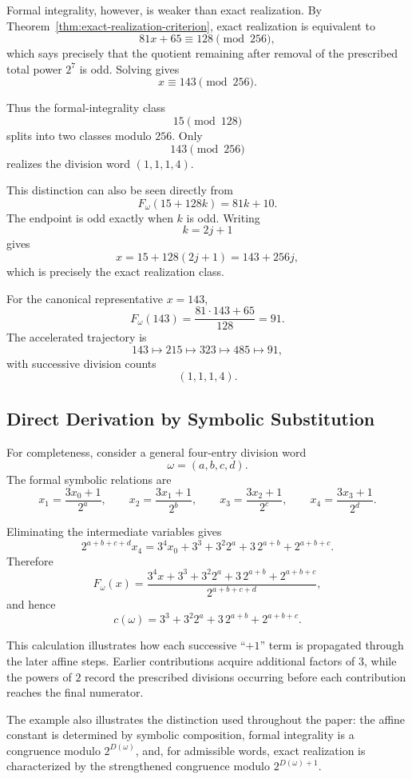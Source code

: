 \documentclass[12pt, oneside]{article}
\numberwithin{equation}{section}
\theoremstyle{definition}
\theoremstyle{plain}
\theoremstyle{remark}
\begin{document}
Formal integrality, however, is weaker than exact realization. By
Theorem~\ref{thm:exact-realization-criterion}, exact realization is
equivalent to
\[
81x+65
\equiv
128
\pmod{256},
\]
which says precisely that the quotient remaining after removal of the
prescribed total power \(2^7\) is odd. Solving gives
\[
\boxed{
x\equiv143\pmod{256}.
}
\]

Thus the formal-integrality class
\[
15\pmod{128}
\]
splits into two classes modulo \(256\). Only
\[
143\pmod{256}
\]
realizes the division word \((1,1,1,4)\).

This distinction can also be seen directly from
\[
F_\omega(15+128k)=81k+10.
\]
The endpoint is odd exactly when \(k\) is odd. Writing
\[
k=2j+1
\]
gives
\[
x
=
15+128(2j+1)
=
143+256j,
\]
which is precisely the exact realization class.

For the canonical representative \(x=143\),
\[
F_\omega(143)
=
\frac{81\cdot143+65}{128}
=
91.
\]
The accelerated trajectory is
\[
143\longmapsto215\longmapsto323\longmapsto485\longmapsto91,
\]
with successive division counts
\[
(1,1,1,4).
\]

\subsection{Direct Derivation by Symbolic Substitution}

For completeness, consider a general four-entry division word
\[
\omega=(a,b,c,d).
\]
The formal symbolic relations are
\[
x_1=\frac{3x_0+1}{2^a},
\qquad
x_2=\frac{3x_1+1}{2^b},
\qquad
x_3=\frac{3x_2+1}{2^c},
\qquad
x_4=\frac{3x_3+1}{2^d}.
\]

Eliminating the intermediate variables gives
\[
2^{a+b+c+d}x_4
=
3^4x_0
+
3^3
+
3^2 2^a
+
3\,2^{a+b}
+
2^{a+b+c}.
\]
Therefore
\[
F_\omega(x)
=
\frac{
3^4x+
3^3+
3^2 2^a+
3\,2^{a+b}+
2^{a+b+c}
}{
2^{a+b+c+d}
},
\]
and hence
\[
\boxed{
c(\omega)
=
3^3+
3^2 2^a+
3\,2^{a+b}+
2^{a+b+c}.
}
\]

This calculation illustrates how each successive ``\(+1\)'' term is
propagated through the later affine steps. Earlier contributions acquire
additional factors of \(3\), while the powers of \(2\) record the prescribed
divisions occurring before each contribution reaches the final numerator.

The example also illustrates the distinction used throughout the paper:
the affine constant is determined by symbolic composition, formal
integrality is a congruence modulo \(2^{D(\omega)}\), and, for admissible
words, exact realization is characterized by the strengthened congruence
modulo \(2^{D(\omega)+1}\).


\clearpage


\end{document}
